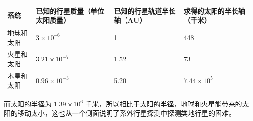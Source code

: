 \documentclass[letterpaper,10pt,english]{sphinxmanual}
\begin{document}
\begin{tabulary}{\linewidth}{|L|L|L|L|}
\hline
\textsf{\relax 
系统
} & \textsf{\relax 
已知的行星质量（单位太阳质量）
} & \textsf{\relax 
已知的行星轨道半长轴（AU）
} & \textsf{\relax 
求得的太阳的半长轴（千米）
}\\
\hline
地球和太阳
 & 
\(3×10^{−6}\)
 & 
1
 & 
448
\\
\hline
火星和太阳
 & 
\(3.21×10^{−7}\)
 & 
1.52
 & 
73
\\
\hline
木星和太阳
 & 
\(0.96×10^{-3}\)
 & 
5.20
 & 
\(7.44×10^5\)
\\
\hline\end{tabulary}


而太阳的半径为 \(1.39\times 10^{6}\) 千米，所以相比于太阳的半径，地球和火星能带来的太阳的移动太小，这也从一个侧面说明了系外行星探测中探测类地行星的困难。
\end{document}
